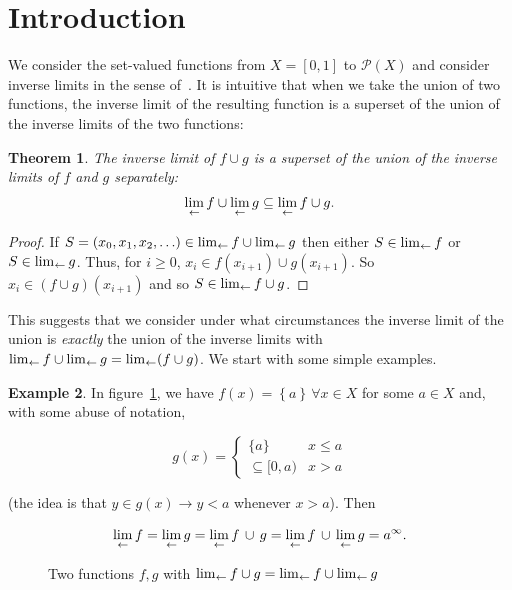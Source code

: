 \documentclass{article}
\newtheorem{thm}{Theorem}
\theoremstyle{definition}
\newtheorem{exam}[thm]{Example}
\begin{document}
\section{Introduction}

We consider the set-valued functions from $X=[0,1]$ to
$\mathcal{P}(X)$ and consider inverse limits in the sense
of~\cite{ingram2012,ingram2012a}.  It is intuitive that when we take
the union of two functions, the inverse limit of the resulting
function is a superset of the union of the inverse limits of the two
functions:

 \begin{thm}
The inverse limit of $f\cup g$ is a superset of the union of the
inverse limits of $f$ and $g$ separately: $$\lim_{\leftarrow} f \cup \lim_{\leftarrow} g
\subseteq\lim_{\leftarrow} f\cup g.$$
 \end{thm}
 \begin{proof}
If $S = (x_0, x_1, x_2, \ldots)\in\lim_{\leftarrow} f\cup\lim_{\leftarrow} g$ then
either $S\in\lim_{\leftarrow} f$ or $S\in\lim_{\leftarrow} g$.  Thus, for $i\geqslant
0$, $x_i\in f(x_{i+1})\cup g(x_{i+1})$.  So $x_i \in ( f \cup g
)(x_{i+1})$ and so $S\in\lim_{\leftarrow} f\cup g$.
 \end{proof}

This suggests that we consider under what circumstances the inverse
limit of the union is {\em exactly} the union of the inverse limits
with $\lim_{\leftarrow} f\cup\lim_{\leftarrow} g = \lim_{\leftarrow} (f\cup g)$.  We start with
some simple examples.

\begin{exam}
In figure~\ref{abuse}, we have $f(x)=\left\lbrace
a\right\rbrace\,\forall x\in X$ for some $a\in X$ and, with some abuse
of notation,

\begin{equation}
  g(x) = \begin{cases}
    \lbrace a\rbrace & x\leqslant a\\
    \subseteq[0,a) & x>a
    \end{cases}
\end{equation}

(the idea is that $y\in g(x)\longrightarrow y<a$ whenever $x>a$). Then

\begin{equation}
\lim_{\leftarrow} f = \lim_{\leftarrow} g =  \lim_{\leftarrow} f \, \cup\, g = \lim_{\leftarrow} f \,\cup\,
\lim_{\leftarrow} g = a^\infty.
\end{equation}
\end{exam}

\begin{figure}[h]
\caption{Two \label{abuse} functions $f,g$ with $\lim_{\leftarrow} f\cup g=\lim_{\leftarrow} f\cup\lim_{\leftarrow} g$}
\end{figure}
\end{document}
